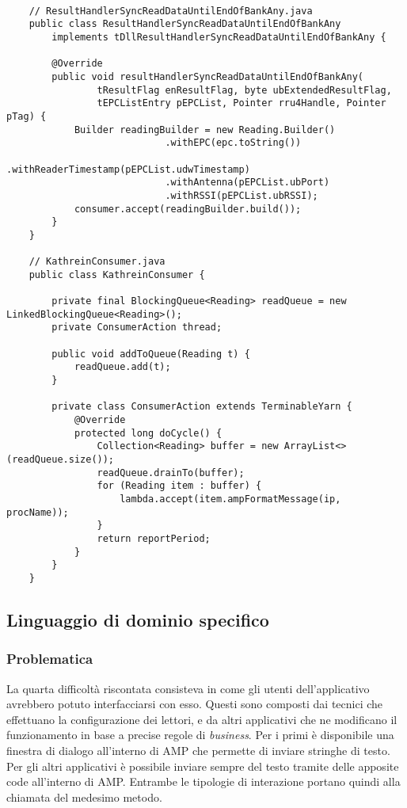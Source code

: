 \label{HandlerReading}
\begin{lstlisting}
    
    // ResultHandlerSyncReadDataUntilEndOfBankAny.java
    public class ResultHandlerSyncReadDataUntilEndOfBankAny
        implements tDllResultHandlerSyncReadDataUntilEndOfBankAny {

        @Override
        public void resultHandlerSyncReadDataUntilEndOfBankAny(
                tResultFlag enResultFlag, byte ubExtendedResultFlag,
                tEPCListEntry pEPCList, Pointer rru4Handle, Pointer pTag) {
            Builder readingBuilder = new Reading.Builder()
				    	    .withEPC(epc.toString())
					        .withReaderTimestamp(pEPCList.udwTimestamp)
					        .withAntenna(pEPCList.ubPort)
					        .withRSSI(pEPCList.ubRSSI);
            consumer.accept(readingBuilder.build());
        }
    }
    
    // KathreinConsumer.java
    public class KathreinConsumer {

        private final BlockingQueue<Reading> readQueue = new LinkedBlockingQueue<Reading>();
        private ConsumerAction thread;
        
        public void addToQueue(Reading t) {
		    readQueue.add(t);
	    }

        private class ConsumerAction extends TerminableYarn {
		    @Override
		    protected long doCycle() {
			    Collection<Reading> buffer = new ArrayList<>(readQueue.size());
			    readQueue.drainTo(buffer);
			    for (Reading item : buffer) {
				    lambda.accept(item.ampFormatMessage(ip, procName));
			    }
			    return reportPeriod;
		    }
	    }
    }
\end{lstlisting}

\subsection{Linguaggio di dominio specifico}
\label{sub-sec:DLS}
\subsubsection*{Problematica}
La quarta difficoltà riscontata consisteva in come gli utenti dell'applicativo avrebbero potuto interfacciarsi con esso.
Questi sono composti dai tecnici che effettuano la configurazione dei lettori, e da altri applicativi che ne modificano il funzionamento
in base a precise regole di \emph{business}. Per i primi è disponibile una finestra di dialogo all'interno di AMP che permette
di inviare stringhe di testo. Per gli altri applicativi è possibile inviare sempre del testo
tramite delle apposite code all'interno di AMP. Entrambe le tipologie di interazione portano quindi alla chiamata del medesimo metodo.

